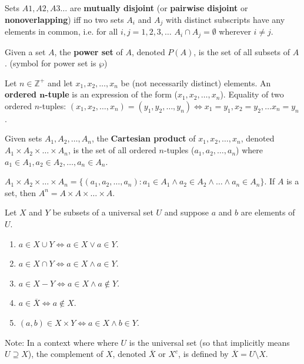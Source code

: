 \documentclass{article}
\begin{document}
\begin{description}
    \item[Mutually disjoint]Sets $A1,A2,A3\dots$ are \textbf{mutually disjoint} (or \textbf{pairwise disjoint} or \textbf{nonoverlapping}) iff no two sets $A_{i}$ and $A_{j}$ with distinct subscripts have any elements in common, i.e. for all $i,j=1,2,3,\dots$ $A_{i}\cap A_{j} =\emptyset$ wherever $i\neq j$.  
    \item[Power Set]Given a set $A$, the \textbf{power set} of $A$, denoted $P(A)$, is the set of all subsets of $A$. (symbol for power set is $\wp$)
    \item[Ordered $n$-tuples]Let $n\in\mathbb{Z}^{+}$ and let $x_{1},x_{2},\dots,x_{n}$ be (not necessarily distinct) elements. An \textbf{ordered $\mathbf{n}$-tuple} is an expression of the form ($x_{1},x_{2},\dots,x_{n}$). Equality of two ordered $n$-tuples: $(x_{1},x_{2},\dots,x_{n})=(y_{1},y_{2},\dots,y_{n})\Leftrightarrow x_{1}=y_{1},x_{2}=y_{2},\dots x_{n}=y_{n}$.
    \item[Cartesian product]Given sets $A_{1},A_{2},\dots,A_{n}$, the \textbf{Cartesian product} of $x_{1},x_{2},\dots,x_{n}$, denoted $A_{1}\times A_{2}\times\dots\times A_{n}$, is the set of all ordered $n$-tuples ($a_{1},a_{2},\dots,a_{n}$) where $a_{1}\in A_{1}, a_{2}\in A_{2},\dots,a_{n}\in A_{n}$.
    \item \qquad $A_{1}\times A_{2}\times\dots\times A_{n}=\{(a_{1},a_{2},\dots,a_{n}):a_{1}\in A_{1}\land  a_{2}\in A_{2}\land\dots\land a_{n}\in A_{n}\}$. If $A$ is a set, then $A^{n}=A\times A \times \dots \times A$.
    \item[Procedural Versions of Set Definitions] Let $X$ and $Y$ be subsets of a universal set $U$ and suppose $a$ and $b$ are elements of $U$. 
    \begin{enumerate}
    	\item $a\in X\cup Y\Leftrightarrow a\in X \lor a\in Y$.
		\item $a\in X\cap Y\Leftrightarrow a\in X \land a\in Y$.
		\item $a\in X - Y\Leftrightarrow a\in X \land a\not\in Y$.
		\item $a\in \overline{X} \Leftrightarrow a\not\in X$.
		\item $(a,b)\in X \times Y\Leftrightarrow a\in X \land b\in Y$.
    \end{enumerate}
	\item Note: In a context where where $U$ is the universal set (so that implicitly means $U \supseteq X$), the complement of $X$, denoted $\overline{X}$ or $X^{c}$, is defined by $\overline{X} = U \setminus X$.
    

\end{description}
\end{document}
